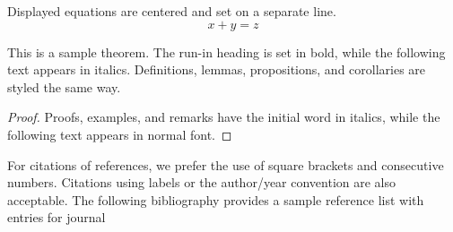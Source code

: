 \documentclass[runningheads]{llncs}
\begin{document}
\noindent Displayed equations are centered and set on a separate
line.
\begin{equation}
x + y = z
\end{equation}

\begin{figure}
\end{figure}

\begin{theorem}
This is a sample theorem. The run-in heading is set in bold, while
the following text appears in italics. Definitions, lemmas,
propositions, and corollaries are styled the same way.
\end{theorem}
%
%
\begin{proof}
Proofs, examples, and remarks have the initial word in italics,
while the following text appears in normal font.
\end{proof}
For citations of references, we prefer the use of square brackets
and consecutive numbers. Citations using labels or the author/year
convention are also acceptable. The following bibliography provides
a sample reference list with entries for journal
%
%
%
% 


%






\end{document}
